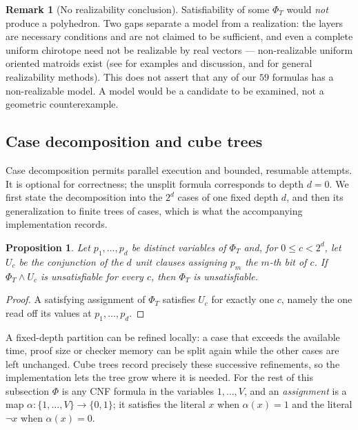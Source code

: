 \documentclass[11pt,reqno]{amsart}
\theoremstyle{plain}
\newtheorem{proposition}[theorem]{Proposition}
\theoremstyle{definition}
\newtheorem{remark}[theorem]{Remark}
\begin{document}
\begin{remark}[No realizability conclusion]\label{rem:noconverse}
Satisfiability of some $\Phi_T$ would \emph{not} produce a polyhedron. Two gaps separate a model from
a realization: the layers are necessary conditions and are not claimed to be sufficient, and even a
complete uniform chirotope need not be realizable by real vectors --- non-realizable uniform oriented
matroids exist (see \cite[Sections~2--3]{Scheucher2023} for examples and discussion,
and \cite{BokowskiSturmfels1989} for general realizability methods).
This does not assert that any of our $59$ formulas has a non-realizable model.
A model would be a candidate to be examined, not a geometric counterexample.
\end{remark}

\subsection{Case decomposition and cube trees}\label{sub:cases}
Case decomposition permits parallel execution and bounded, resumable attempts.
It is optional for correctness; the unsplit formula corresponds to depth $d=0$.
We first state the decomposition into the $2^d$ cases of one fixed depth $d$, and then its
generalization to finite trees of cases, which is what the accompanying implementation records.

\begin{proposition}\label{prop:cases}
Let $p_1,\dots,p_d$ be distinct variables of $\Phi_T$ and, for $0\le c<2^{d}$, let $U_c$ be the
conjunction of the $d$ unit clauses assigning $p_m$ the $m$-th bit of $c$. If $\Phi_T\wedge U_c$ is
unsatisfiable for every $c$, then $\Phi_T$ is unsatisfiable.
\end{proposition}

\begin{proof}
A satisfying assignment of $\Phi_T$ satisfies $U_c$ for exactly one $c$, namely the one read off its
values at $p_1,\dots,p_d$.
\end{proof}

A fixed-depth partition can be refined locally: a case that exceeds the available time,
proof size or checker memory can be split again while the other cases are left unchanged.
Cube trees record precisely these successive refinements, so the implementation lets the
tree grow where it is needed. For the rest of this subsection $\Phi$ is any CNF formula in the variables
$1,\dots,V$, and an \emph{assignment} is a map $\alpha\colon\{1,\dots,V\}\to\{0,1\}$; it satisfies
the literal $x$ when $\alpha(x)=1$ and the literal $\neg x$ when $\alpha(x)=0$.
\end{document}
